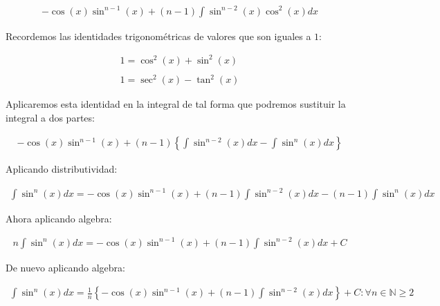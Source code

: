 \begin{equation*}
    \begin{gathered}
        -\cos(x)\sin^{n-1}(x) + (n-1)\int \sin^{n-2}(x)\cos^{2}(x)dx
    \end{gathered}
\end{equation*}

Recordemos las identidades trigonométricas de valores que son iguales a \(\displaystyle 1\):

\begin{equation*}
    \begin{gathered}
        1=\cos^2(x)+\sin^{2}(x)\\\\
        1=\sec^{2}(x)-\tan^{2}(x)
    \end{gathered}
\end{equation*}

Aplicaremos esta identidad en la integral de tal forma que podremos sustituir la integral a dos partes:

\begin{equation*}
    \begin{gathered}
        -\cos(x)\sin^{n-1}(x) + (n-1)\left\{\int \sin^{n-2}(x)dx -\int\sin^{n}(x)dx\right\}
    \end{gathered}
\end{equation*}

Aplicando distributividad:

\begin{equation*}
    \begin{gathered}
        \int\sin^{n}(x)dx=-\cos(x)\sin^{n-1}(x) + (n-1)\int \sin^{n-2}(x)dx -(n-1)\int\sin^{n}(x)dx
    \end{gathered}
\end{equation*}

Ahora aplicando algebra:

\begin{equation*}
    \begin{gathered}
        n\int\sin^{n}(x)dx=-\cos(x)\sin^{n-1}(x) + (n-1)\int \sin^{n-2}(x)dx + C
    \end{gathered}
\end{equation*}

De nuevo aplicando algebra:

\begin{equation*}
    \begin{gathered}
        \int\sin^{n}(x)dx=\frac{1}{n}\left\{-\cos(x)\sin^{n-1}(x) + (n-1)\int \sin^{n-2}(x)dx\right\} + C \colon \forall n\in\mathbb{N}\geq 2
    \end{gathered}
\end{equation*}

